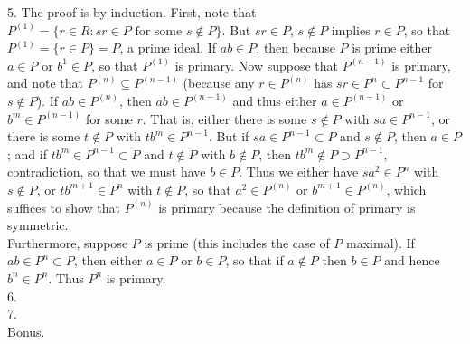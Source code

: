 \documentclass[11pt]{article}
\begin{document}
\num{5.} The proof is by induction. First, note that $P^{(1)}=\{r\in R: sr\in
P\text{ for some }s\notin P\}$. But $sr\in P$, $s\notin P$ implies $r\in P$,
so that $P^{(1)}=\{r\in P\}=P$, a prime ideal. If $ab\in P$, then because
$P$ is prime either $a\in P$ or $b^1\in P$, so that $P^{(1)}$ is primary. Now
suppose that $P^{(n-1)}$ is primary, and note that $P^{(n)}\subseteq P^{(n-1)}$
(because any $r\in P^{(n)}$ has $sr\in P^n\subset P^{n-1}$ for $s\notin P$). If
$ab\in P^{(n)}$, then $ab\in P^{(n-1)}$ and thus either $a\in P^{(n-1)}$ or
$b^m\in P^{(n-1)}$ for some $r$. That is, either there is some $s\notin P$
with $sa\in P^{n-1}$, or there is some $t\notin P$ with $tb^m\in P^{n-1}$. But
if $sa\in P^{n-1}\subset P$ and $s\notin P$, then $a\in P$; and if $tb^m\in
P^{n-1}\subset P$ and $t\notin P$ with $b\notin P$, then $tb^m\notin P\supset
P^{n-1}$, contradiction, so that we must have $b\in P$. Thus we either have
$sa^2\in P^n$ with $s\notin P$, or $tb^{m+1}\in P^n$ with $t\notin P$, so
that $a^2\in P^{(n)}$ or $b^{m+1}\in P^{(n)}$, which suffices to show that
$P^{(n)}$ is primary because the definition of primary is symmetric.       \\

Furthermore, suppose $P$ is prime (this includes the case of $P$ maximal). If
$ab\in P^n\subset P$, then either $a\in P$ or $b\in P$, so that if $a\notin P$
then $b\in P$ and hence $b^n\in P^n$. Thus $P^n$ is primary.\\

\num{6.}        \\

\num{7.}        \\

\num{Bonus.}         
\end{document}
